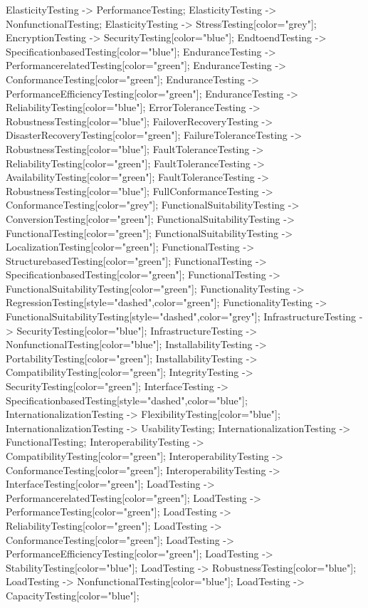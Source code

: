 \documentclass{article}
\begin{document}
{ElasticityTesting -> PerformanceTesting;
ElasticityTesting -> NonfunctionalTesting;
ElasticityTesting -> StressTesting[color="grey"];
EncryptionTesting -> SecurityTesting[color="blue"];
EndtoendTesting -> SpecificationbasedTesting[color="blue"];
EnduranceTesting -> PerformancerelatedTesting[color="green"];
EnduranceTesting -> ConformanceTesting[color="green"];
EnduranceTesting -> PerformanceEfficiencyTesting[color="green"];
EnduranceTesting -> ReliabilityTesting[color="blue"];
ErrorToleranceTesting -> RobustnessTesting[color="blue"];
FailoverRecoveryTesting -> DisasterRecoveryTesting[color="green"];
FailureToleranceTesting -> RobustnessTesting[color="blue"];
FaultToleranceTesting -> ReliabilityTesting[color="green"];
FaultToleranceTesting -> AvailabilityTesting[color="green"];
FaultToleranceTesting -> RobustnessTesting[color="blue"];
FullConformanceTesting -> ConformanceTesting[color="grey"];
FunctionalSuitabilityTesting -> ConversionTesting[color="green"];
FunctionalSuitabilityTesting -> FunctionalTesting[color="green"];
FunctionalSuitabilityTesting -> LocalizationTesting[color="green"];
FunctionalTesting -> StructurebasedTesting[color="green"];
FunctionalTesting -> SpecificationbasedTesting[color="green"];
FunctionalTesting -> FunctionalSuitabilityTesting[color="green"];
FunctionalityTesting -> RegressionTesting[style="dashed",color="green"];
FunctionalityTesting -> FunctionalSuitabilityTesting[style="dashed",color="grey"];
InfrastructureTesting -> SecurityTesting[color="blue"];
InfrastructureTesting -> NonfunctionalTesting[color="blue"];
InstallabilityTesting -> PortabilityTesting[color="green"];
InstallabilityTesting -> CompatibilityTesting[color="green"];
IntegrityTesting -> SecurityTesting[color="green"];
InterfaceTesting -> SpecificationbasedTesting[style="dashed",color="blue"];
InternationalizationTesting -> FlexibilityTesting[color="blue"];
InternationalizationTesting -> UsabilityTesting;
InternationalizationTesting -> FunctionalTesting;
InteroperabilityTesting -> CompatibilityTesting[color="green"];
InteroperabilityTesting -> ConformanceTesting[color="green"];
InteroperabilityTesting -> InterfaceTesting[color="green"];
LoadTesting -> PerformancerelatedTesting[color="green"];
LoadTesting -> PerformanceTesting[color="green"];
LoadTesting -> ReliabilityTesting[color="green"];
LoadTesting -> ConformanceTesting[color="green"];
LoadTesting -> PerformanceEfficiencyTesting[color="green"];
LoadTesting -> StabilityTesting[color="blue"];
LoadTesting -> RobustnessTesting[color="blue"];
LoadTesting -> NonfunctionalTesting[color="blue"];
LoadTesting -> CapacityTesting[color="blue"];
}
\end{document}

